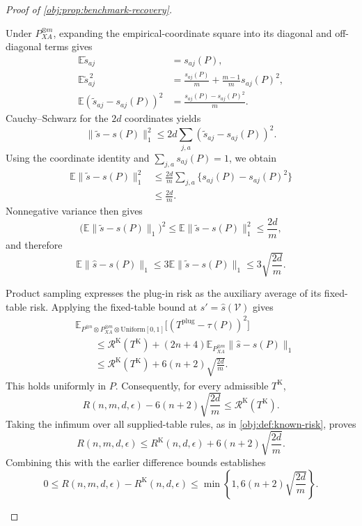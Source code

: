 \begin{proof}[Proof of \cref{obj:prop:benchmark-recovery}]
\begin{enumerate}
Under \(P_{XA}^{\otimes m}\), expanding the empirical-coordinate square into its diagonal and off-diagonal terms gives
\[
\begin{aligned}
\mathbb E\widetilde s_{aj}&=s_{aj}(P),\\
\mathbb E\widetilde s_{aj}^{\,2}
&=\frac{s_{aj}(P)}m+\frac{m-1}{m}s_{aj}(P)^2,\\
\mathbb E(\widetilde s_{aj}-s_{aj}(P))^2
&=\frac{s_{aj}(P)-s_{aj}(P)^2}{m}.
\end{aligned}
\]
Cauchy--Schwarz for the \(2d\) coordinates yields
\[
\|\widetilde s-s(P)\|_1^2
\le2d\sum_{j,a}(\widetilde s_{aj}-s_{aj}(P))^2.
\]
Using the coordinate identity and \(\sum_{j,a}s_{aj}(P)=1\), we obtain
\[
\begin{aligned}
\mathbb E\|\widetilde s-s(P)\|_1^2
&\le\frac{2d}{m}
\sum_{j,a}\{s_{aj}(P)-s_{aj}(P)^2\}\\
&\le\frac{2d}{m}.
\end{aligned}
\]
Nonnegative variance then gives
\[
\bigl(\mathbb E\|\widetilde s-s(P)\|_1\bigr)^2
\le\mathbb E\|\widetilde s-s(P)\|_1^2
\le\frac{2d}{m},
\]
and therefore
\[
\mathbb E\|\widehat s-s(P)\|_1
\le3\mathbb E\|\widetilde s-s(P)\|_1
\le3\sqrt{\frac{2d}{m}}.
\]

Product sampling expresses the plug-in risk as the auxiliary average of its fixed-table risk. Applying the fixed-table bound at \(s'=\widehat s(\mathcal V)\) gives
\[
\begin{aligned}
&\mathbb E_{P^{\otimes n}\otimes P_{XA}^{\otimes m}
\otimes\mathrm{Uniform}[0,1]}
\bigl[(T^{\mathrm{plug}}-\tau(P))^2\bigr]\\
&\qquad\le
\mathscr R^{\mathrm K}(T^{\mathrm K})
+(2n+4)\mathbb E_{P_{XA}^{\otimes m}}\|\widehat s-s(P)\|_1\\
&\qquad\le
\mathscr R^{\mathrm K}(T^{\mathrm K})
+6(n+2)\sqrt{\frac{2d}{m}}.
\end{aligned}
\]
This holds uniformly in \(P\). Consequently, for every admissible \(T^{\mathrm K}\),
\[
R(n,m,d,\epsilon)-6(n+2)\sqrt{\frac{2d}{m}}
\le\mathscr R^{\mathrm K}(T^{\mathrm K}).
\]
Taking the infimum over all supplied-table rules, as in \cref{obj:def:known-risk}, proves
\[
R(n,m,d,\epsilon)
\le R^{\mathrm K}(n,d,\epsilon)
+6(n+2)\sqrt{\frac{2d}{m}}.
\]
Combining this with the earlier difference bounds establishes
\[
0\le R(n,m,d,\epsilon)-R^{\mathrm K}(n,d,\epsilon)
\le\min\left\{1,6(n+2)\sqrt{\frac{2d}{m}}\right\}.
\]


\end{enumerate}
\end{proof}
